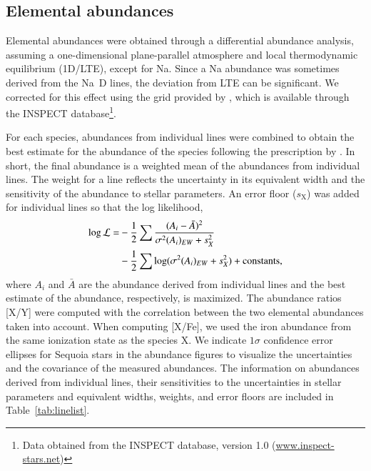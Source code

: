 \documentclass{aa}
\begin{document}
\subsection{Elemental abundances\label{sec:abundance}}

Elemental abundances were obtained through a differential abundance analysis, assuming a one-dimensional plane-parallel atmosphere and local thermodynamic equilibrium (1D/LTE), except for Na. 
Since a Na abundance was sometimes derived from the Na~D lines, the deviation from LTE can be significant. 
We corrected for this effect using the grid provided by \citet{Lind2011a}, which is available through the INSPECT database\footnote{
Data obtained from the INSPECT database, version 1.0 (\url{www.inspect-stars.net})}.

For each species, abundances from individual lines were combined to obtain the best estimate for the abundance of the species following the prescription by \citet{Ji2020a}. 
In short, the final abundance is a weighted mean of the abundances from individual lines.
The weight for a line reflects the uncertainty in its equivalent width and the sensitivity of the abundance to stellar parameters.
An error floor ($s_\mathrm{X}$) was added for individual lines so that the log likelihood,
\begin{align}
\log{\cal L}=&-\frac{1}{2}\sum\frac{(A_i - \bar{A})^2}{\sigma^2(A_i)_{EW}+s_X^2} \\ 
&-\frac{1}{2}\sum\log(\sigma^2(A_i)_{EW}+s_X^2)+\mathrm{constants},
\end{align}
where $A_i$ and $\bar{A}$ are the abundance derived from individual lines and the best estimate of the abundance, respectively, is maximized.
The abundance ratios [{X}/{Y}] were computed with the correlation between the two elemental abundances taken into account.
When computing [{X}/{Fe}], we used the iron abundance from the same ionization state as the species X.
We indicate $1\sigma$ confidence error ellipses for Sequoia stars in the abundance figures to visualize the uncertainties and the covariance of the measured abundances.
The information on abundances derived from individual lines, their sensitivities to the uncertainties in stellar parameters and equivalent widths, weights, and error floors are included in Table~\ref{tab:linelist}.
\end{document}
